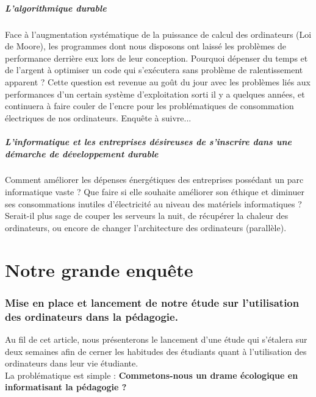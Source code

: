 \documentclass[a4paper,11pt,french]{article}
\begin{document}
\subsubsection{L'algorithmique durable}
Face à l'augmentation systématique de la puissance de calcul des ordinateurs (Loi de Moore), les programmes dont nous disposons ont laissé les problèmes de performance derrière eux lors de leur conception. Pourquoi dépenser du temps et de l'argent à optimiser un code qui s'exécutera sans problème de ralentissement apparent ? 
Cette question est revenue au goût du jour avec les problèmes liés aux performances d'un certain système d'exploitation sorti il y a quelques années, et continuera à faire couler de l'encre pour les problématiques de consommation électriques de nos ordinateurs. Enquête à suivre... \\

\subsubsection{L'informatique et les entreprises désireuses de s'inscrire dans une démarche de développement durable}
Comment améliorer les dépenses énergétiques des entreprises possédant un parc informatique vaste ? 
Que faire si elle souhaite améliorer son éthique et diminuer ses consommations inutiles d'électricité au niveau des matériels informatiques ?\\
Serait-il plus sage de couper les serveurs la nuit, de récupérer la chaleur des ordinateurs, ou encore de changer l'architecture des ordinateurs (parallèle).


\newpage
\part{Notre grande enquête}

\section[Lancement de l'étude]{Mise en place et lancement de notre étude sur l'utilisation des ordinateurs dans la pédagogie.}
Au fil de cet article, nous présenterons le lancement d'une étude qui s'étalera sur deux semaines afin de cerner les habitudes des étudiants quant à l'utilisation des ordinateurs dans leur vie étudiante.\\

La problématique est simple : \textbf{Commetons-nous un drame écologique en informatisant la pédagogie ?}\\
\end{document}
